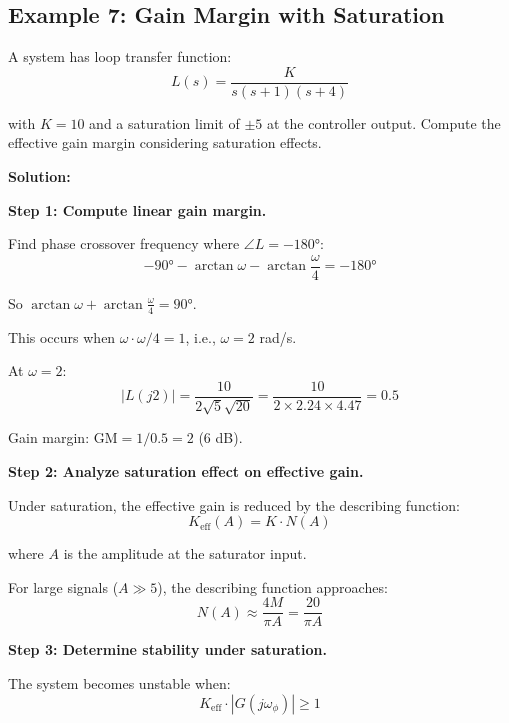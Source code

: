 \subsection{Example 7: Gain Margin with Saturation}

\begin{example}
\label{ex:gain_margin_saturation}
A system has loop transfer function:
\begin{equation}
L(s) = \frac{K}{s(s+1)(s+4)}
\end{equation}

with $K = 10$ and a saturation limit of $\pm 5$ at the controller output. Compute the effective gain margin considering saturation effects.

\textbf{Solution:}

\textbf{Step 1: Compute linear gain margin.}

Find phase crossover frequency where $\angle L = -180°$:
\begin{equation}
-90° - \arctan\omega - \arctan\frac{\omega}{4} = -180°
\end{equation}

So $\arctan\omega + \arctan\frac{\omega}{4} = 90°$.

This occurs when $\omega \cdot \omega/4 = 1$, i.e., $\omega = 2$ rad/s.

At $\omega = 2$:
\begin{equation}
|L(j2)| = \frac{10}{2\sqrt{5}\sqrt{20}} = \frac{10}{2 \times 2.24 \times 4.47} = 0.5
\end{equation}

Gain margin: $\text{GM} = 1/0.5 = 2$ (6 dB).

\textbf{Step 2: Analyze saturation effect on effective gain.}

Under saturation, the effective gain is reduced by the describing function:
\begin{equation}
K_{\text{eff}}(A) = K \cdot N(A)
\end{equation}

where $A$ is the amplitude at the saturator input.

For large signals ($A \gg 5$), the describing function approaches:
\begin{equation}
N(A) \approx \frac{4M}{\pi A} = \frac{20}{\pi A}
\end{equation}

\textbf{Step 3: Determine stability under saturation.}

The system becomes unstable when:
\begin{equation}
K_{\text{eff}} \cdot |G(j\omega_{\phi})| \geq 1
\end{equation}


\end{example}
